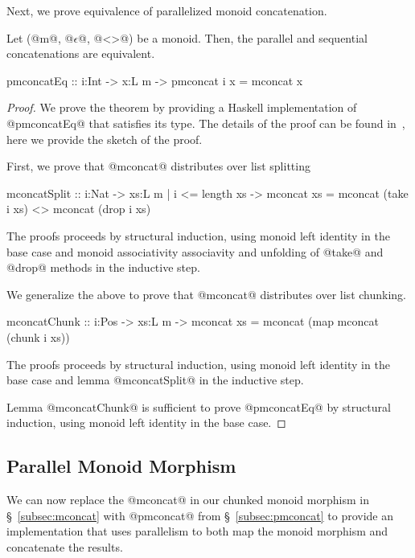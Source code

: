 Next, we prove equivalence of parallelized monoid concatenation.
%
\begin{theorem}\label{theorem:equivalence:concat}
Let (@m@, @$\epsilon$@, @<>@) be a monoid.
Then, the parallel and sequential concatenations are equivalent.
\begin{code}
  pmconcatEq :: i:Int -> x:L m -> {pmconcat i x = mconcat x}
\end{code}
\end{theorem}

\begin{proof}
We prove the theorem by providing a Haskell implementation of @pmconcatEq@
that satisfies its type.
%
The details of the proof can be found in~\cite{implementation},
here we provide the sketch of the proof.

First, we prove that @mconcat@ distributes over list splitting
\begin{code}
  mconcatSplit
    :: i:Nat -> xs:{L m | i <= length xs}
    -> {mconcat xs = mconcat (take i xs) <> mconcat (drop i xs)}
\end{code}
%
The proofs proceeds by structural induction, using monoid left identity in the base case
and monoid associativity associavity and unfolding of @take@ and @drop@
methods in the inductive step.

We generalize the above
to prove that @mconcat@ distributes over list chunking.
\begin{code}
  mconcatChunk
    :: i:Pos -> xs:L m
    -> {mconcat xs = mconcat (map mconcat (chunk i xs))}
\end{code}
%
The proofs proceeds by structural induction, using monoid left identity in the base case
and lemma @mconcatSplit@ in the inductive step.

Lemma @mconcatChunk@ is sufficient to prove @pmconcatEq@ by structural induction,
using monoid left identity in the base case.
\cqed\end{proof}

\subsection{Parallel Monoid Morphism}\label{subsec:both-levels}
We can now replace the @mconcat@ in our chunked monoid morphism in
\S~\ref{subsec:mconcat} with @pmconcat@ from
\S~\ref{subsec:pmconcat} to provide an implementation that uses
parallelism to both map the monoid morphism and concatenate the
results.

